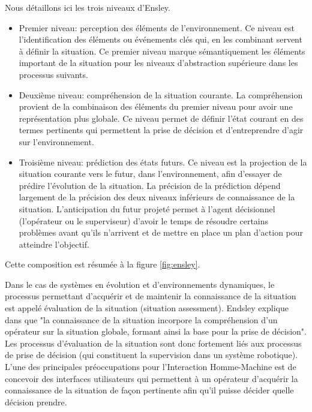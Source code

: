 \documentclass[a4paper,11pt,twoside]{StyleThese}
\begin{document}
Nous détaillons ici les trois niveaux d'Ensley.
\begin{itemize}
\item Premier niveau: perception des éléments de l'environnement. Ce niveau est l'identification des
éléments ou événements clés qui, en les combinant servent à définir la situation.
Ce premier niveau marque sémantiquement les éléments important de la situation pour
les niveaux d'abstraction supérieure dans les processus suivants.
\item Deuxième niveau: compréhension de la situation courante. La compréhension provient de 
la combinaison des éléments du premier niveau pour avoir une représentation plus globale. Ce niveau permet de
définir l'état courant en des termes pertinents qui permettent la prise de 
décision et d'entreprendre d'agir sur l'environnement.
\item Troisième niveau: prédiction des états futurs. Ce niveau est la projection de la situation courante vers le futur, dans l'environnement, afin d'essayer de prédire l'évolution de la situation. La précision de la prédiction dépend largement de la précision des deux niveaux inférieurs de connaissance de la situation. L'anticipation du futur projeté permet à l'agent décisionnel (l'opérateur ou le superviseur) d'avoir le temps de résoudre certains problèmes avant qu'ils n'arrivent et de mettre en place un plan d'action pour atteindre l'objectif.
\end{itemize}
Cette composition est résumée à la figure \ref{fig:ensley}.

Dans le cas de systèmes en évolution et d'environnements dynamiques, le processus permettant d'acquérir et de maintenir la connaissance de la situation est appelé évaluation de la situation (situation assessment). Endsley explique dans \cite{endsley1995} que "la connaissance de la situation incorpore la compréhension d'un opérateur sur la situation globale, formant ainsi la base pour la prise de décision". Les processus d'évaluation de la situation sont donc fortement liés aux processus de prise de décision (qui constituent la supervision dans un système robotique).
L'une des principales préoccupations pour l'Interaction Homme-Machine est de concevoir des interfaces utilisateurs qui permettent à un opérateur d'acquérir la connaissance de la situation de façon pertinente afin qu'il puisse décider quelle décision prendre.
\end{document}
